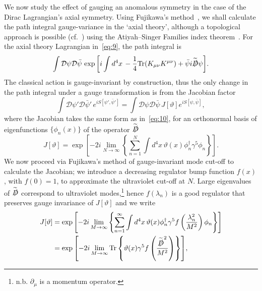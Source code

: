 \documentclass[11pt, a4paper]{article}
\begin{document}
We now study the effect of gauging an anomalous symmetry in the case of
the Dirac Lagrangian's axial symmetry. Using Fujikawa's method~\cite{Fujikawa,Fujikawa2},
we shall calculate the path integral gauge-variance in the `axial theory',
although a topological approach is possible
(cf.~\cite{AlvarezGuameNon-AB,Sumitani1984})
using the Atiyah–Singer Families index theorem~\cite{FamiliesIndex}.
For the axial theory Lagrangian in~\eqref{eq:9}, 
the path integral is 
\begin{equation}
  \int{\mathcal{D}\psi\mathcal{D}\bar{\psi}\,
    \exp{\left[i \int{d^4x\, -\frac{1}{4}\mathrm{Tr}(K_{\mu\nu}K^{\mu\nu}) 
          + \bar{\psi}i\widetilde{\slashed{D}}\psi
  } \right]}}.
\end{equation}
The classical action is gauge-invariant by construction, thus the only change in
the path integral under a gauge transformation is from the Jacobian factor
\begin{equation}
    \int{\mathcal{D}\psi'\mathcal{D}\bar{\psi}'\, e^{iS[\psi',\bar{\psi}']} } =
    \int{\mathcal{D}\psi\mathcal{D}\bar{\psi}\, J[\vartheta] e^{iS[\psi,\bar{\psi}]} },
\end{equation}
where the Jacobian takes the same form as in~\eqref{eq:10}, for an orthonormal
basis of eigenfunctions $\{ \phi_n(x)\}$ of the operator $\widetilde{\slashed{D}}$
\begin{equation}
  J[\vartheta] = \exp{\left[ -2i \lim_{N \rightarrow \infty}{ \left\{
  \sum_{n=1}^N{ \int{d^4x\, \vartheta(x)\phi_n^\dagger\gamma^5\phi_n} } \right\} } \right]}. 
\end{equation}
We now proceed via Fujikawa's method of gauge-invariant mode cut-off
to calculate the Jacobian; we introduce a decreasing regulator
bump function $f(x)$, with $f(0) = 1$, to approximate
the ultraviolet cut-off at $N$. Large eigenvalues of $\widetilde{\slashed{D}}$
correspond to ultraviolet modes,\footnote{n.b. $\partial_\mu$ is a momentum
operator.} hence $f(\lambda_n)$ is a good regulator that preserves gauge invariance 
of $J[\vartheta]$ and we write
\begin{equation}
  \begin{split}
  J[\vartheta] &= \exp{\left[ -2i \lim_{M \rightarrow \infty}{ \left\{
          \sum_{n=1}^{\infty}{ \int{d^4x\, \vartheta(x)\phi_n^\dagger\gamma^5
          f\left(\frac{\lambda_n^2}{M^2}\right) \phi_n} } \right\} } \right]} \\
      &= \exp{\left[ -2i \lim_{M \rightarrow \infty}{ \mathrm{Tr}\left\{ \vartheta(x)\gamma^5
    f\left( \frac{ {\widetilde{\slashed{D}}}^2 }{M^2}\right) \right\}} \right]}, 
  \end{split}
\end{equation}
\end{document}
